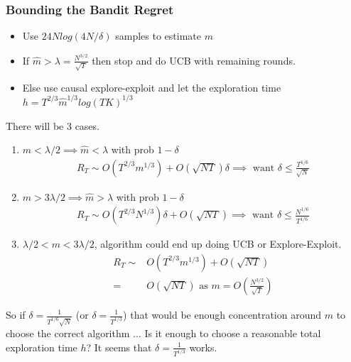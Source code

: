 \documentclass{article}
\newcommand{\eq}[1]{\begin{align*}#1\end{align*}}
\theoremstyle{plain}
\theoremstyle{definition}
\begin{document}
\subsubsection{Bounding the Bandit Regret}

\begin{itemize}
\item Use $24Nlog(4N/\delta)$ samples to estimate $m$
\item If $\hat m > \lambda = \frac{N^{3/2}}{\sqrt{T}}$ then stop and do UCB with remaining rounds.
\item Else use causal explore-exploit and let the exploration time $h = T^{2/3}\hat{m}^{1/3}log(TK)^{1/3}$ 
\end{itemize}

There will be 3 cases.
\begin{enumerate}
\item $m < \lambda/2 \implies \hat{m} < \lambda$ with prob $1-\delta$
\eq {
R_T \sim O(T^{2/3}m^{1/3}) + O(\sqrt{NT})\delta \implies \text { want } \delta \leq \frac{T^{1/6}}{\sqrt{N}}
}
\item $m > 3\lambda/2 \implies \hat{m} > \lambda$ with prob $1-\delta$
\eq {
R_T \sim O(T^{2/3}N^{1/3})\delta + O(\sqrt{NT}) \implies \text { want } \delta \leq \frac{N^{1/6}}{T^{1/6}}
}
\item $\lambda/2 < m < 3\lambda/2$, algorithm could end up doing UCB or Explore-Exploit.
\eq{
R_T \sim  & O(T^{2/3}m^{1/3}) + O(\sqrt{NT}) \\
= &  O(\sqrt{NT}) \text { as } m = O(\frac{N^{3/2}}{\sqrt{T}})
}
\end{enumerate}

So if $\delta = \frac{1}{T^{1/6}\sqrt{N}}$ (or $\delta = \frac{1}{T^{1/3}}$) that would be enough concentration around $m$ to choose the correct algorithm ... Is it enough to choose a reasonable total exploration time $h$? It seems that $\delta = \frac{1}{T^{1/3}}$ works.
\end{document}
